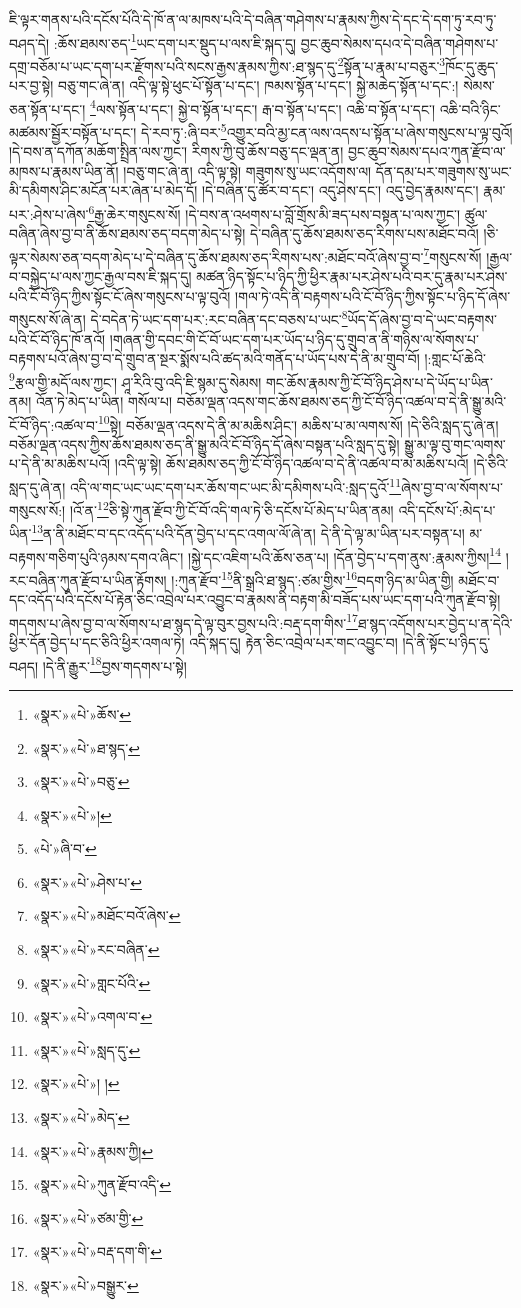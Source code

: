 ཇི་ལྟར་གནས་པའི་དངོས་པོའི་དེ་ཁོ་ན་ལ་མཁས་པའི་དེ་བཞིན་གཤེགས་པ་རྣམས་ཀྱིས་དེ་དང་དེ་དག་ཏུ་རབ་ཏུ་བཤད་དེ། :ཆོས་ཐམས་ཅད་\footnote{«སྣར་»«པེ་»ཆོས་}ཡང་དག་པར་སྡུད་པ་ལས་ཇི་སྐད་དུ། བྱང་ཆུབ་སེམས་དཔའ་དེ་བཞིན་གཤེགས་པ་དགྲ་བཅོམ་པ་ཡང་དག་པར་རྫོགས་པའི་སངས་རྒྱས་རྣམས་ཀྱིས་:ཐ་སྙད་དུ་\footnote{«སྣར་»«པེ་»ཐ་སྙད་}སྟོན་པ་རྣམ་པ་བཅུར་\footnote{«སྣར་»«པེ་»བཅུ་}ཁོང་དུ་ཆུད་པར་བྱ་སྟེ། བཅུ་གང་ཞེ་ན། འདི་ལྟ་སྟེ་ཕུང་པོ་སྟོན་པ་དང་། ཁམས་སྟོན་པ་དང་། སྐྱེ་མཆེད་སྟོན་པ་དང་:། སེམས་ཅན་སྟོན་པ་དང་། \footnote{«སྣར་»«པེ་»།  }ལས་སྟོན་པ་དང་། སྐྱེ་བ་སྟོན་པ་དང་། རྒ་བ་སྟོན་པ་དང་། འཆི་བ་སྟོན་པ་དང་། འཆི་བའི་ཉིང་མཚམས་སྦྱོར་བསྟོན་པ་དང་། དེ་རབ་ཏུ་:ཞི་བར་\footnote{«པེ་»ཞི་བ་}འགྱུར་བའི་མྱ་ངན་ལས་འདས་པ་སྟོན་པ་ཞེས་གསུངས་པ་ལྟ་བུའོ། །དེ་བས་ན་དཀོན་མཆོག་སྤྲིན་ལས་ཀྱང་། རིགས་ཀྱི་བུ་ཆོས་བཅུ་དང་ལྡན་ན། བྱང་ཆུབ་སེམས་དཔའ་ཀུན་རྫོབ་ལ་མཁས་པ་རྣམས་ཡིན་ནོ། །བཅུ་གང་ཞེ་ན། འདི་ལྟ་སྟེ། གཟུགས་སུ་ཡང་འདོགས་ལ། དོན་དམ་པར་གཟུགས་སུ་ཡང་མི་དམིགས་ཤིང་མངོན་པར་ཞེན་པ་མེད་དོ། །དེ་བཞིན་དུ་ཚོར་བ་དང་། འདུ་ཤེས་དང་། འདུ་བྱེད་རྣམས་དང་། རྣམ་པར་:ཤེས་པ་ཞེས་\footnote{«སྣར་»«པེ་»ཤེས་པ་}རྒྱ་ཆེར་གསུངས་སོ། །དེ་བས་ན་འཕགས་པ་བློ་གྲོས་མི་ཟད་པས་བསྟན་པ་ལས་ཀྱང་། ཚུལ་བཞིན་ཞེས་བྱ་བ་ནི་ཆོས་ཐམས་ཅད་བདག་མེད་པ་སྟེ། དེ་བཞིན་དུ་ཆོས་ཐམས་ཅད་རིགས་པས་མཐོང་བའོ། །ཅི་ལྟར་སེམས་ཅན་བདག་མེད་པ་དེ་བཞིན་དུ་ཆོས་ཐམས་ཅད་རིགས་པས་:མཐོང་བའོ་ཞེས་བྱ་བ་\footnote{«སྣར་»«པེ་»མཐོང་བའོ་ཞེས་}གསུངས་སོ། །རྒྱལ་བ་བསྐྱེད་པ་ལས་ཀྱང་རྒྱལ་བས་ཇི་སྐད་དུ། མཚན་ཉིད་སྟོང་པ་ཉིད་ཀྱི་ཕྱིར་རྣམ་པར་ཤེས་པའི་བར་དུ་རྣམ་པར་ཤེས་པའི་ངོ་བོ་ཉིད་ཀྱིས་སྟོང་ངོ་ཞེས་གསུངས་པ་ལྟ་བུའོ། །གལ་ཏེ་འདི་ནི་བརྟགས་པའི་ངོ་བོ་ཉིད་ཀྱིས་སྟོང་པ་ཉིད་དོ་ཞེས་གསུངས་སོ་ཞེ་ན། དེ་བདེན་ཏེ་ཡང་དག་པར་:རང་བཞིན་དང་བཅས་པ་ཡང་\footnote{«སྣར་»«པེ་»རང་བཞིན་}ཡོད་དོ་ཞེས་བྱ་བ་དེ་ཡང་བརྟགས་པའི་ངོ་བོ་ཉིད་ཁོ་ནའོ། །གཞན་གྱི་དབང་གི་ངོ་བོ་ཡང་དག་པར་ཡོད་པ་ཉིད་དུ་གྲུབ་ན་ནི་གཉིས་ལ་སོགས་པ་བརྟགས་པའོ་ཞེས་བྱ་བ་དེ་གྲུབ་ན་སྔར་སྨོས་པའི་ཚད་མའི་གནོད་པ་ཡོད་པས་དེ་ནི་མ་གྲུབ་བོ། །:གླང་པོ་ཆེའི་\footnote{«སྣར་»«པེ་»གླང་པོའི་}རྩལ་གྱི་མདོ་ལས་ཀྱང་། ཤཱ་རིའི་བུ་འདི་ཇི་སྙམ་དུ་སེམས། གང་ཆོས་རྣམས་ཀྱི་ངོ་བོ་ཉིད་ཤེས་པ་དེ་ཡོད་པ་ཡིན་ནམ། འོན་ཏེ་མེད་པ་ཡིན། གསོལ་པ། བཅོམ་ལྡན་འདས་གང་ཆོས་ཐམས་ཅད་ཀྱི་ངོ་བོ་ཉིད་འཚལ་བ་དེ་ནི་སྒྱུ་མའི་ངོ་བོ་ཉིད་:འཚལ་བ་\footnote{«སྣར་»«པེ་»འགལ་བ་}སྟེ། བཅོམ་ལྡན་འདས་དེ་ནི་མ་མཆིས་ཤིང་། མཆིས་པ་མ་ལགས་སོ། །དེ་ཅིའི་སླད་དུ་ཞེ་ན། བཅོམ་ལྡན་འདས་ཀྱིས་ཆོས་ཐམས་ཅད་ནི་སྒྱུ་མའི་ངོ་བོ་ཉིད་དོ་ཞེས་བསྟན་པའི་སླད་དུ་སྟེ། སྒྱུ་མ་ལྟ་བུ་གང་ལགས་པ་དེ་ནི་མ་མཆིས་པའོ། །འདི་ལྟ་སྟེ། ཆོས་ཐམས་ཅད་ཀྱི་ངོ་བོ་ཉིད་འཚལ་བ་དེ་ནི་འཚལ་བ་མ་མཆིས་པའོ། །དེ་ཅིའི་སླད་དུ་ཞེ་ན། འདི་ལ་གང་ཡང་ཡང་དག་པར་ཆོས་གང་ཡང་མི་དམིགས་པའི་:སླད་དུའོ་\footnote{«སྣར་»«པེ་»སླད་དུ་}ཞེས་བྱ་བ་ལ་སོགས་པ་གསུངས་སོ:། །འོ་ན་\footnote{«སྣར་»«པེ་»། །}ཅི་སྟེ་ཀུན་རྫོབ་ཀྱི་ངོ་བོ་འདི་གལ་ཏེ་ཅི་དངོས་པོ་མེད་པ་ཡིན་ནམ། འདི་དངོས་པོ་:མེད་པ་ཡིན་\footnote{«སྣར་»«པེ་»མེད་}ན་ནི་མཐོང་བ་དང་འདོད་པའི་དོན་བྱེད་པ་དང་འགལ་ལོ་ཞེ་ན། དེ་ནི་དེ་ལྟ་མ་ཡིན་པར་བསྟན་པ། མ་བརྟགས་གཅིག་པུའི་ཉམས་དགའ་ཞིང་། །སྐྱེ་དང་འཇིག་པའི་ཆོས་ཅན་པ། །དོན་བྱེད་པ་དག་ནུས་:རྣམས་ཀྱིས།\footnote{«སྣར་»«པེ་»རྣམས་ཀྱི།} །རང་བཞིན་ཀུན་རྫོབ་པ་ཡིན་རྟོགས། །:ཀུན་རྫོབ་\footnote{«སྣར་»«པེ་»ཀུན་རྫོབ་འདི་}ནི་སྒྲའི་ཐ་སྙད་:ཙམ་གྱིས་\footnote{«སྣར་»«པེ་»ཙམ་གྱི་}བདག་ཉིད་མ་ཡིན་གྱི། མཐོང་བ་དང་འདོད་པའི་དངོས་པོ་རྟེན་ཅིང་འབྲེལ་པར་འབྱུང་བ་རྣམས་ནི་བརྟག་མི་བཟོད་པས་ཡང་དག་པའི་ཀུན་རྫོབ་སྟེ། གདགས་པ་ཞེས་བྱ་བ་ལ་སོགས་པ་ཐ་སྙད་དེ་ལྟ་བུར་བྱས་པའི་:བརྡ་དག་གིས་\footnote{«སྣར་»«པེ་»བརྡ་དག་གི་}ཐ་སྙད་འདོགས་པར་བྱེད་པ་ན་དེའི་ཕྱིར་དོན་བྱེད་པ་དང་ཅིའི་ཕྱིར་འགལ་ཏེ། འདི་སྐད་དུ། རྟེན་ཅིང་འབྲེལ་པར་གང་འབྱུང་བ། །དེ་ནི་སྟོང་པ་ཉིད་དུ་བཤད། །དེ་ནི་རྒྱུར་\footnote{«སྣར་»«པེ་»བསྒྱུར་}བྱས་གདགས་པ་སྟེ། 